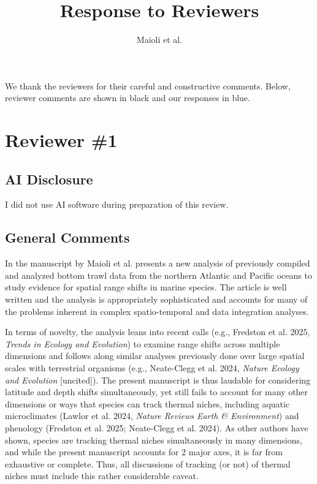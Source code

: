 \documentclass[11pt]{article}
\title{Response to Reviewers}
\author{Maioli et al.}
\date{}
\newcommand{\reviewer}[1]{\par\medskip\noindent\textcolor{revcolor}{#1}\par}
\begin{document}
\maketitle

\noindent We thank the reviewers for their careful and constructive comments.
Below, reviewer comments are shown in \textcolor{revcolor}{black} and our
responses in \textcolor{replycolor}{blue}.

\section*{Reviewer \#1}

\subsection*{AI Disclosure}
\reviewer{I did not use AI software during preparation of this review.}

\subsection*{General Comments}

\reviewer{In the manuscript by Maioli et al. presents a new analysis of previously
compiled and analyzed bottom trawl data from the northern Atlantic and Pacific
oceans to study evidence for spatial range shifts in marine species. The article
is well written and the analysis is appropriately sophisticated and accounts for
many of the problems inherent in complex spatio-temporal and data integration
analyses.}

\reviewer{In terms of novelty, the analysis leans into recent calls (e.g.,
Fredston et al. 2025, \textit{Trends in Ecology and Evolution}) to examine range
shifts across multiple dimensions and follows along similar analyses previously
done over large spatial scales with terrestrial organisms (e.g., Neate-Clegg et
al. 2024, \textit{Nature Ecology and Evolution} [uncited]). The present manuscript
is thus laudable for considering latitude and depth shifts simultaneously, yet
still fails to account for many other dimensions or ways that species can track
thermal niches, including aquatic microclimates (Lawlor et al. 2024, \textit{Nature
Reviews Earth \& Environment}) and phenology (Fredston et al. 2025; Neate-Clegg et
al. 2024). As other authors have shown, species are tracking thermal niches
simultaneously in many dimensions, and while the present manuscript accounts for 2
major axes, it is far from exhaustive or complete. Thus, all discussions of
tracking (or not) of thermal niches must include this rather considerable caveat.}
\end{document}
